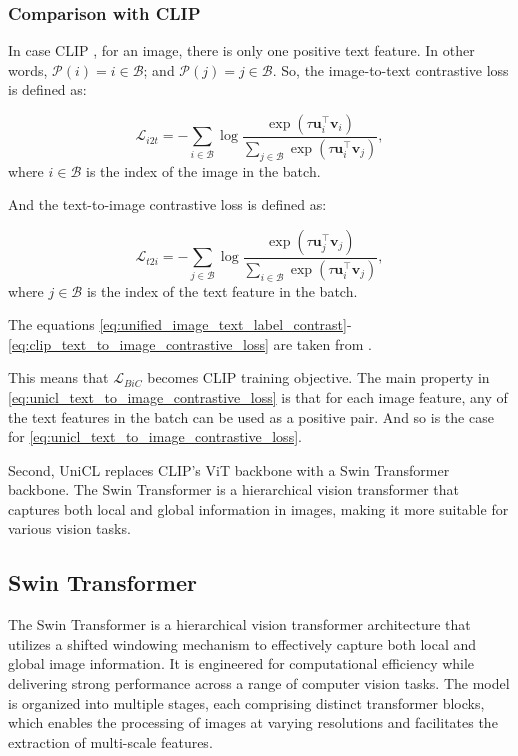 \subsubsection{Comparison with CLIP}
\label{subsec:clip_vs_unicl}

In case CLIP \cite{vl_clip}, for an image, there is only one positive text feature. In other words, $\mathcal{P}(i) = {i} \in \mathcal{B}$; and $\mathcal{P}(j) = {j} \in \mathcal{B}$. So, the image-to-text contrastive loss is defined as:

\begin{equation} \label{eq:clip_image_to_text_contrastive_loss}
    \mathcal{L}_{i2t} = - \sum_{i \in \mathcal{B}} 
    \log \frac{\exp(\tau \mathbf{u}_i^\top \mathbf{v}_i)}{\sum_{j \in \mathcal{B}} \exp(\tau \mathbf{u}_i^\top \mathbf{v}_j)},
\end{equation}
where $i \in \mathcal{B}$ is the index of the image in the batch.

And the text-to-image contrastive loss is defined as:

\begin{equation} \label{eq:clip_text_to_image_contrastive_loss}
    \mathcal{L}_{t2i} = - \sum_{j \in \mathcal{B}} 
    \log \frac{\exp(\tau \mathbf{u}_j^\top \mathbf{v}_j)}{\sum_{i \in \mathcal{B}} \exp(\tau \mathbf{u}_i^\top \mathbf{v}_j)},
\end{equation}
where $j \in \mathcal{B}$ is the index of the text feature in the batch. 

The equations \ref{eq:unified_image_text_label_contrast}-\ref{eq:clip_text_to_image_contrastive_loss} are taken from \cite{vl_unicl}.

This means that $\mathcal{L}_{BiC}$ becomes CLIP training objective. The main property in \autoref{eq:unicl_text_to_image_contrastive_loss} is that for each image feature, any of the text features in the batch can be used as a positive pair. And so is the case for \autoref{eq:unicl_text_to_image_contrastive_loss}.

Second, UniCL replaces CLIP's ViT backbone with a Swin Transformer \cite{transformer_swin} backbone. The Swin Transformer is a hierarchical vision transformer that captures both local and global information in images, making it more suitable for various vision tasks.

\subsection{Swin Transformer}
\label{subsec:swin_transformer}
The Swin Transformer \cite{transformer_swin} is a hierarchical vision transformer architecture that utilizes a shifted windowing mechanism to effectively capture both local and global image information. It is engineered for computational efficiency while delivering strong performance across a range of computer vision tasks. The model is organized into multiple stages, each comprising distinct transformer blocks, which enables the processing of images at varying resolutions and facilitates the extraction of multi-scale features.


